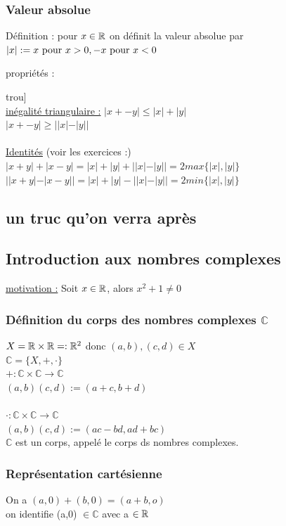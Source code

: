 \documentclass[12pt,a4paper]{article}
\begin{document}
\subsubsection{Valeur absolue}
\begin{boite}
Définition : pour $x \in \mathbb{R}$ on définit la valeur absolue par $|x| := x \mbox{ pour } x > 0, -x \mbox{ pour } x < 0$
\end{boite}

propriétés :{trou]\\
\underline{inégalité triangulaire :}
$|x+- y| \leq |x| + |y|$\\
$|x+- y| \geq ||x| - |y||$\\
\\
\underline{Identités} (voir les exercices :)\\
$|x + y| + |x-y| = |x| + |y| + ||x| - |y|| = 2max\{|x|, |y|\}$\\
$||x+y|-|x-y|| = |x|+|y|-||x|-|y|| = 2min \{|x|, |y|\}$

\subsection{un truc qu'on verra après}
\subsection{Introduction aux nombres complexes}
\underline{motivation :} Soit $x\in \mathbb{R}$, alors $x^2 + 1 \neq 0$
\subsubsection{Définition du corps des nombres complexes $\mathbb{C}$}
$X = \mathbb{R} \times \mathbb{R} =: \mathbb{R}^2$ donc $(a,b), (c,d) \in X$\\
$\mathbb{C} = \{X, +, \cdot\}$\\
$+ : \mathbb{C} \times \mathbb{C} \longrightarrow \mathbb{C}$\\
$(a,b)(c,d) := (a+c, b+d)$\\
\\
$\cdot  : \mathbb{C} \times \mathbb{C} \longrightarrow \mathbb{C}$\\
$(a,b)(c,d) := (ac-bd, ad+bc)$\\
$\mathbb{C}$ est un corps, appelé le corps ds nombres complexes.
\subsubsection{Représentation cartésienne}
On a $(a,0) + (b,0) = (a+b, o)$\\
on identifie (a,0) $\in \mathbb{C}$ avec a $\in \mathbb{R}$

}
\end{document}
